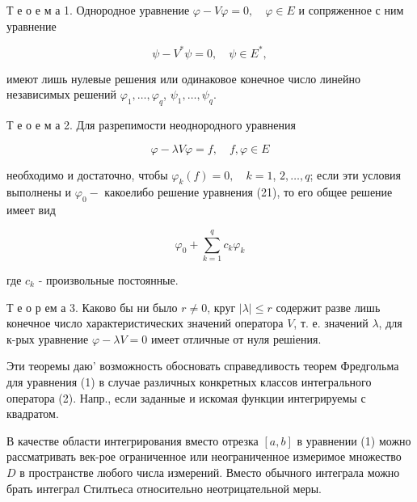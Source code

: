 \documentclass[10pt]{article}
\begin{document}
Т е о е м а 1. Однородное уравнение $\varphi-V \varphi=0, \quad \varphi \in E$ и сопряженное с ним уравнение



\[

\psi-V^{*} \psi=0, \quad \psi \in E^{*},

\]



имеют лишь нулевые решения или одинаковое конечное число линейно независимых решений $\varphi_{1}, \ldots, \varphi_{q}$, $\psi_{1}, \ldots, \psi_{q}$.



Т е о е м а 2. Для разрепимости неоднородного уравнения



\[

\varphi-\lambda V \varphi=f, \quad f, \varphi \in E

\]



необходимо и достаточно, чтобы $\varphi_{k}(f)=0, \quad k=1$, $2, \ldots, q$; если эти условия выполнены и $\varphi_{0}-$ какоелибо решение уравнения (21), то его общее решение имеет вид



\[

\varphi_{0}+\sum_{k=1}^{q} c_{k} \varphi_{k}

\]



где $c_{k}$ - произвольные постоянные.



Т е о р ем а 3. Каково бы ни было $r \neq 0$, круг $|\lambda| \leqslant r$ содержит разве лишь конечное число характеристических значений оператора $V$, т. е. значений $\lambda$, для к-рых уравнение $\varphi-\lambda V=0$ имеет отличные от нуля решіения.



Эти теоремы даю' возможность обосновать справедливость теорем Фредгольма для уравнения (1) в случае различных конкретных классов интегрального оператора (2). Напр., если заданные и искомая функции интегрируемы с квадратом.



В качестве области интегрирования вместо отрезка $[a, b]$ в уравнении (1) можно рассматривать век-рое ограниченное или неограниченное измеримое множество $D$ в пространстве любого числа измерений. Вместо обычного интеграла можно брать интеграл Стилтьеса относительно неотрицательной меры.
\end{document}

